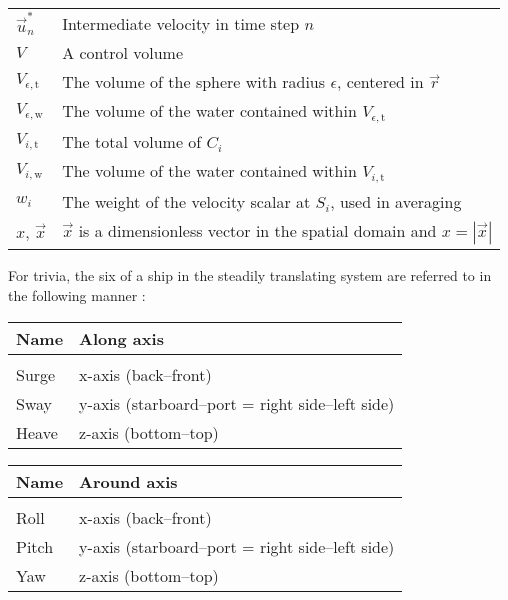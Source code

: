 {\begin{center}
\begin{longtabu}{l X}
    $\vec{u}^*_n$       & Intermediate velocity in time step $n$ \\
    $V$                 & A control volume \\
    $V_{\epsilon,\text{t}}$     & The volume of the sphere with radius $\epsilon$,
                                  centered in $\vec{r}$ \\
    $V_{\epsilon,\text{w}}$     & The volume of the water contained within $V_{\epsilon,\text{t}}$ \\
    $V_{i,\text{t}}$    & The total volume of $C_i$ \\
    $V_{i,\text{w}}$    & The volume of the water contained within $V_{i,\text{t}}$ \\
    $w_i$               & The weight of the velocity scalar at $S_i$, used in averaging \\
    $x,\,\vec{x}$       & $\vec{x}$ is a dimensionless vector in the spatial domain
                          and $x = |\vec{x}|$ \\
\end{longtabu}
\end{center}
}


\begin{center}
\tableoftaa
\end{center}



For trivia, the six \DOF of a ship in the steadily translating system are referred to in the following manner \citep{Journee2001a}:


\begin{longtabu}{l X}
    \textbf{Name} & \textbf{Along axis} \\
    \hline
    \\
    \endhead
    
	Surge & x-axis (back--front) \\
	Sway  & y-axis (starboard--port = right side--left side) \\
	Heave & z-axis (bottom--top) \\
\end{longtabu}


\begin{longtabu}{l X}
    \textbf{Name} & \textbf{Around axis}\\
    \hline
    \\
    \endhead
    
    Roll  & x-axis (back--front) \\
    Pitch & y-axis (starboard--port = right side--left side) \\
    Yaw   & z-axis (bottom--top) \\
\end{longtabu}
